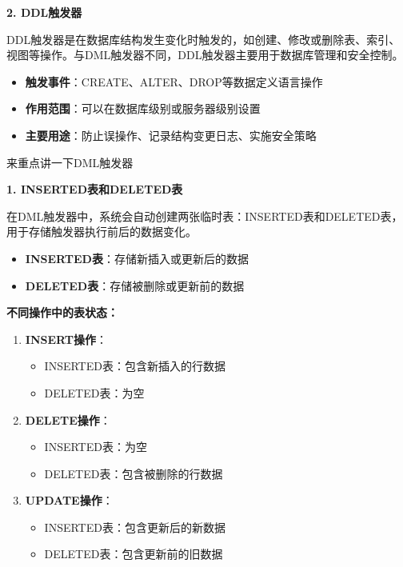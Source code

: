 \textbf{2. DDL触发器}

\qquad DDL触发器是在数据库结构发生变化时触发的，如创建、修改或删除表、索引、视图等操作。与DML触发器不同，DDL触发器主要用于数据库管理和安全控制。

\begin{itemize}
  \item \textbf{触发事件}：CREATE、ALTER、DROP等数据定义语言操作
  \item \textbf{作用范围}：可以在数据库级别或服务器级别设置
  \item \textbf{主要用途}：防止误操作、记录结构变更日志、实施安全策略
\end{itemize}

\vspace{6pt}

\qquad 来重点讲一下DML触发器

\textbf{1. INSERTED表和DELETED表}

\qquad 在DML触发器中，系统会自动创建两张临时表：INSERTED表和DELETED表，用于存储触发器执行前后的数据变化。

\begin{itemize}
  \item \textbf{INSERTED表}：存储新插入或更新后的数据
  \item \textbf{DELETED表}：存储被删除或更新前的数据
\end{itemize}

\textbf{不同操作中的表状态：}

\begin{enumerate}
  \item \textbf{INSERT操作}：
    \begin{itemize}
      \item INSERTED表：包含新插入的行数据
      \item DELETED表：为空
    \end{itemize}

  \item \textbf{DELETE操作}：
    \begin{itemize}
      \item INSERTED表：为空
      \item DELETED表：包含被删除的行数据
    \end{itemize}

  \item \textbf{UPDATE操作}：
    \begin{itemize}
      \item INSERTED表：包含更新后的新数据
      \item DELETED表：包含更新前的旧数据
    \end{itemize}
\end{enumerate}


